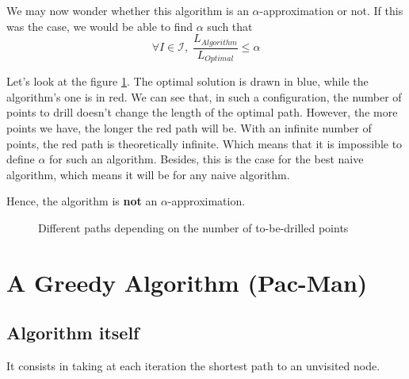 \documentclass[11pt]{article}
\begin{document}
We may now wonder whether this algorithm is an $\alpha$-approximation or not. If this was the case, we would be able to find $\alpha$ such that
\[
	\forall I \in \mathcal{I}, \; \frac{{L}_{Algorithm}}{{L}_{Optimal}} \leq \alpha
\]

Let's look at the figure \ref{fig:counter-example}. The optimal solution is drawn in \textcolor{myblue}{blue}, while the algorithm's one
is in \textcolor{myred}{red}. We can see that, in such a configuration, the number of points to drill doesn't change the length of the
optimal path. However, the more points we have, the longer the red path will be. With an infinite number of points, the red path
is theoretically infinite. Which means that it is impossible to define $\alpha$ for such an algorithm. Besides, this is the case for the best
naive algorithm, which means it will be for any naive algorithm.

Hence, the algorithm is \textbf{not} an $\alpha$-approximation.


\begin{figure}
        \centering
        \begin{subfigure}[b]{0.2\textwidth}
        \end{subfigure}
		\hfill
        \begin{subfigure}[b]{0.2\textwidth}
        \end{subfigure}
		\hfill
        \begin{subfigure}[b]{0.2\textwidth}
        \end{subfigure}
        \caption{Different paths depending on the number of to-be-drilled points}
		\label{fig:counter-example}
\end{figure}


\section{A Greedy Algorithm (Pac-Man)}
\subsection{Algorithm itself}
It consists in taking at each iteration the shortest path to an unvisited node.
\end{document}

